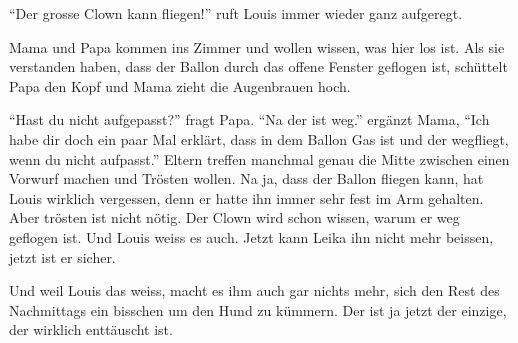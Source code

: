 \enquote{Der grosse Clown kann fliegen!} ruft Louis immer wieder ganz aufgeregt.

Mama und Papa kommen ins Zimmer und wollen wissen, was hier los ist. Als sie verstanden haben, dass der Ballon durch das offene Fenster geflogen ist, schüttelt Papa den Kopf und Mama zieht die Augenbrauen hoch.

\enquote{Hast du nicht aufgepasst?} fragt Papa. \enquote{Na der ist weg.} ergänzt Mama, \enquote{Ich habe dir doch ein paar Mal erklärt, dass in dem Ballon Gas ist und der wegfliegt, wenn du nicht aufpasst.} Eltern treffen manchmal genau die Mitte zwischen einen Vorwurf machen und Trösten wollen. Na ja, dass der Ballon fliegen kann, hat Louis wirklich vergessen, denn er hatte ihn immer sehr fest im Arm gehalten. Aber trösten ist nicht nötig. Der Clown wird schon wissen, warum er weg geflogen ist. Und Louis weiss es auch. Jetzt kann Leika ihn nicht mehr beissen, jetzt ist er sicher.

Und weil Louis das weiss, macht es ihm auch gar nichts mehr, sich den Rest des Nachmittags ein bisschen um den Hund zu kümmern. Der ist ja jetzt der einzige, der wirklich enttäuscht ist.

 \hfill {\color{red}\decofourleft}
